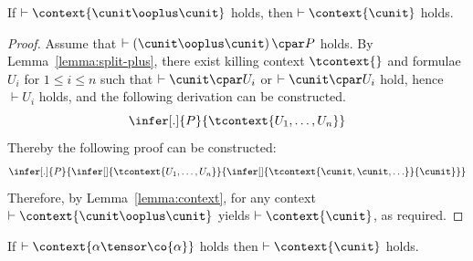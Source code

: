 \documentclass[UKenglish,acmsmall,authorversion]{acmart}
\theoremstyle{plain}
\begin{document}
\begin{lemma}
If $\vdash \context{ \cunit \ooplus \cunit }$ holds, then $\vdash \context{ \cunit }$ holds.
\end{lemma}
\begin{proof}
Assume that $\vdash \left( \cunit \ooplus \cunit \right) \cpar P$ holds. By Lemma~\ref{lemma:split-plus}, there exist killing context $\tcontext{}$
and formulae $U_i$ for $1 \leq i \leq n$ such that $\vdash \cunit \cpar U_i$ or $\vdash \cunit \cpar U_i$ hold, hence $\vdash U_i$ holds, and the following derivation can be constructed.
\[
\infer[.]{
P
}{
 \tcontext{ U_1, \hdots, U_n }
}
\]
Thereby the following proof can be constructed:
\[
\infer[.]{
 P
}{
\infer[]{
 \tcontext{ U_1, \hdots, U_n } 
}{
\infer[]{
 \tcontext{ \cunit, \cunit, \hdots } 
}{ \cunit
}}}
\]
Therefore, by Lemma~\ref{lemma:context}, for any context $\vdash \context{ \cunit \ooplus \cunit }$ yields $\vdash \context{ \cunit }$, as required.
\end{proof}
%
\begin{lemma}
If $\vdash \context{ \alpha \tensor \co{\alpha} }$ holds
then $\vdash \context{ \cunit }$ holds.
\end{lemma}
\end{document}
